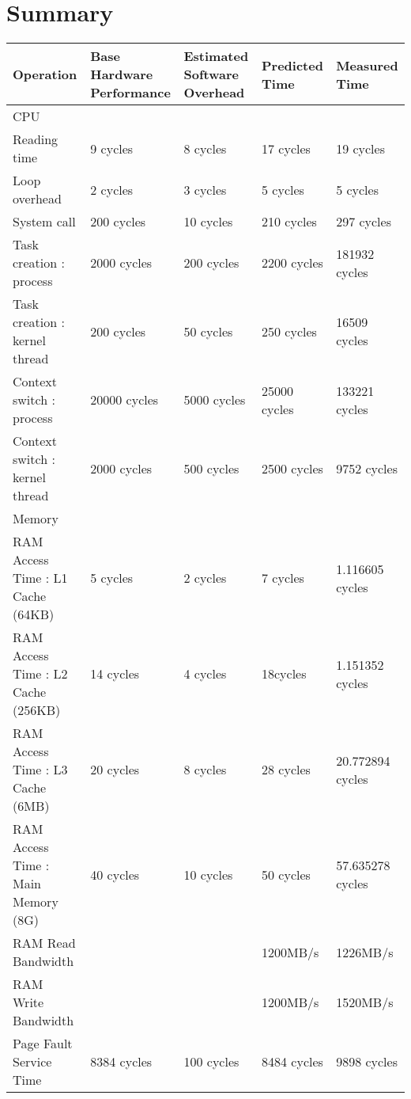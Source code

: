 \chapter{Summary}

\small
\begin{center}
\begin{tabular}{| p{4cm} | p{2.5cm} | p{2.5cm} | p{2.5cm} | p{2.5cm} |}
\hline
Operation  & Base Hardware Performance  & Estimated Software Overhead  & Predicted Time  & Measured Time   \\
\hline 
CPU & & & & \\
\hline
Reading time & 9 cycles & 8 cycles & 17 cycles & 19 cycles \\
Loop overhead & 2 cycles& 3 cycles& 5 cycles& 5 cycles\\
System call & 200 cycles& 10 cycles& 210 cycles& 297 cycles \\
Task creation : process & 2000 cycles& 200 cycles& 2200 cycles& 181932 cycles \\
Task creation : kernel thread    & 200 cycles& 50 cycles& 250 cycles& 16509 cycles\\
Context switch : process & 20000 cycles& 5000 cycles& 25000 cycles& 133221  cycles\\
Context switch : kernel thread    & 2000 cycles& 500 cycles& 2500 cycles& 9752 cycles\\
\hline 
Memory & & & & \\
\hline
RAM Access Time : L1 Cache (64KB) &  5 cycles& 2 cycles& 7 cycles& 1.116605 cycles \\
RAM Access Time : L2 Cache (256KB) & 14 cycles& 4 cycles& 18cycles &  1.151352 cycles\\
RAM Access Time : L3 Cache (6MB) & 20 cycles& 8 cycles& 28 cycles& 20.772894 cycles\\
RAM Access Time : Main Memory (8G) & 40 cycles& 10 cycles& 50 cycles&  57.635278 cycles\\
RAM Read Bandwidth & & & 1200MB/s & 1226MB/s \\
RAM Write Bandwidth & & & 1200MB/s & 1520MB/s \\
Page Fault Service Time & 8384 cycles& 100 cycles& 8484 cycles& 9898 cycles\\
\end{tabular}
\end{center}



